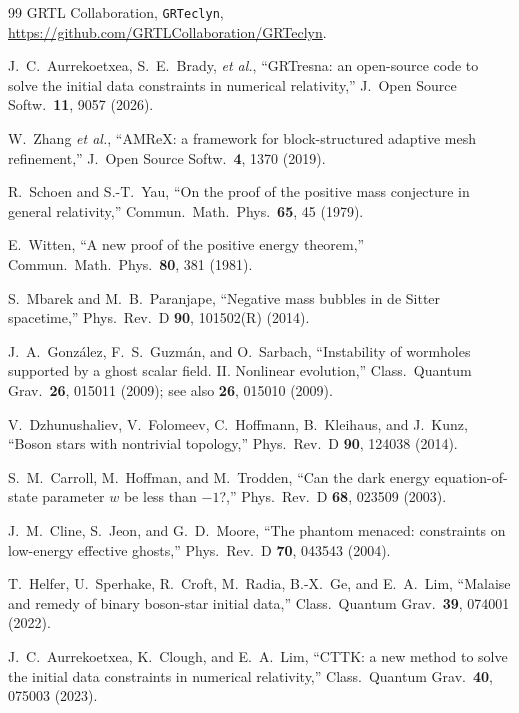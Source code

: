 \documentclass[twocolumn,floatfix,aps,prd,superscriptaddress,nofootinbib]{revtex4-2}
\begin{document}
\begin{thebibliography}{99}
GRTL Collaboration,
\newblock \texttt{GRTeclyn},
\newblock \url{https://github.com/GRTLCollaboration/GRTeclyn}.

J.~C.~Aurrekoetxea, S.~E.~Brady, \emph{et al.},
\newblock ``GRTresna: an open-source code to solve the initial data constraints in numerical relativity,''
\newblock J.\ Open Source Softw.\ \textbf{11}, 9057 (2026).

W.~Zhang \emph{et al.},
\newblock ``AMReX: a framework for block-structured adaptive mesh refinement,''
\newblock J.\ Open Source Softw.\ \textbf{4}, 1370 (2019).

R.~Schoen and S.-T.~Yau,
\newblock ``On the proof of the positive mass conjecture in general relativity,''
\newblock Commun.\ Math.\ Phys.\ \textbf{65}, 45 (1979).

E.~Witten,
\newblock ``A new proof of the positive energy theorem,''
\newblock Commun.\ Math.\ Phys.\ \textbf{80}, 381 (1981).

S.~Mbarek and M.~B.~Paranjape,
\newblock ``Negative mass bubbles in de Sitter spacetime,''
\newblock Phys.\ Rev.\ D \textbf{90}, 101502(R) (2014).

J.~A.~Gonz\'alez, F.~S.~Guzm\'an, and O.~Sarbach,
\newblock ``Instability of wormholes supported by a ghost scalar field. II. Nonlinear evolution,''
\newblock Class.\ Quantum Grav.\ \textbf{26}, 015011 (2009); see also \textbf{26}, 015010 (2009).

V.~Dzhunushaliev, V.~Folomeev, C.~Hoffmann, B.~Kleihaus, and J.~Kunz,
\newblock ``Boson stars with nontrivial topology,''
\newblock Phys.\ Rev.\ D \textbf{90}, 124038 (2014).

S.~M.~Carroll, M.~Hoffman, and M.~Trodden,
\newblock ``Can the dark energy equation-of-state parameter $w$ be less than $-1$?,''
\newblock Phys.\ Rev.\ D \textbf{68}, 023509 (2003).

J.~M.~Cline, S.~Jeon, and G.~D.~Moore,
\newblock ``The phantom menaced: constraints on low-energy effective ghosts,''
\newblock Phys.\ Rev.\ D \textbf{70}, 043543 (2004).

T.~Helfer, U.~Sperhake, R.~Croft, M.~Radia, B.-X.~Ge, and E.~A.~Lim,
\newblock ``Malaise and remedy of binary boson-star initial data,''
\newblock Class.\ Quantum Grav.\ \textbf{39}, 074001 (2022).

J.~C.~Aurrekoetxea, K.~Clough, and E.~A.~Lim,
\newblock ``CTTK: a new method to solve the initial data constraints in numerical relativity,''
\newblock Class.\ Quantum Grav.\ \textbf{40}, 075003 (2023).


\end{thebibliography}
\end{document}
